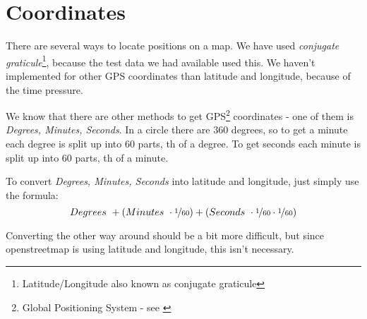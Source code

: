 \section{Coordinates}
There are several ways to locate positions on a map. We have used \emph{conjugate graticule}\footnote{Latitude/Longitude also known as conjugate graticule}, because the test data we had available used this. We haven't implemented for other GPS coordinates than latitude and longitude, because of the time pressure.

We know that there are other methods to get GPS\footnote{Global Positioning System - see \cite{GPS}} coordinates - one of them is \emph{Degrees, Minutes, Seconds}. In a circle there are 360 degrees, so to get a minute each degree is split up into 60 parts, th of a degree. To get seconds each minute is split up into 60 parts, th of a minute.

To convert \emph{Degrees, Minutes, Seconds} into latitude and longitude, just simply use the formula:
\begin{equation}
Degrees~ + \left(Minutes~ \cdot \nicefrac{1}{60}\right) + \left(Seconds~ \cdot \nicefrac{1}{60} \cdot \nicefrac{1}{60}\right)
\end{equation}

Converting the other way around should be a bit more difficult, but since openstreetmap is using latitude and longitude, this isn't necessary.